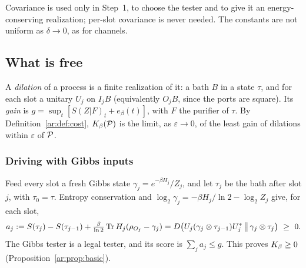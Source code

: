 Covariance is used only in Step~1, to choose the tester and to give it an energy-conserving realization; per-slot covariance is never needed. The constants are not uniform as $\delta\to0$, as for channels.

\subsection{What is free}\label{ar:sec:free}

A \emph{dilation} of a process is a finite realization of it: a bath $B$ in a state $\tau$, and for each slot a unitary $U_j$ on $I_jB$ (equivalently $O_jB$, since the ports are square). Its \emph{gain} is $g=\sup_t[S(Z|F)_t+e_\beta(t)]$, with $F$ the purifier of $\tau$. By Definition~\ref{ar:def:cost}, $K_\beta(\mathcal P)$ is the limit, as $\varepsilon\to0$, of the least gain of dilations within $\varepsilon$ of $\mathcal P$.

\subsubsection{Driving with Gibbs inputs}

Feed every slot a fresh Gibbs state $\gamma_j=e^{-\beta H_j}/Z_j$, and let $\tau_j$ be the bath after slot $j$, with $\tau_0=\tau$. Entropy conservation and $\log_2\gamma_j=-\beta H_j/\ln2-\log_2Z_j$ give, for each slot,
\begin{equation}\label{ar:eq:defect}
a_j:=S(\tau_j)-S(\tau_{j-1})+\tfrac{\beta}{\ln2}\Tr H_j(\rho_{O_j}-\gamma_j)=D\bigl(U_j(\gamma_j\otimes\tau_{j-1})U_j^*\,\big\|\,\gamma_j\otimes\tau_j\bigr)\ \ge\ 0.
\end{equation}
The Gibbs tester is a legal tester, and its score is $\sum_ja_j\le g$. This proves $K_\beta\ge0$ (Proposition~\ref{ar:prop:basic}).

